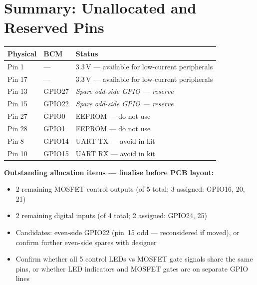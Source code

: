 \documentclass[11pt,a4paper]{article}
\newcommand{\na}{---}
\begin{document}
\section{Summary: Unallocated and Reserved Pins}

\begin{tabular}{L{2cm} L{2cm} L{9cm}}
  \toprule
  \textbf{Physical} & \textbf{BCM} & \textbf{Status} \\
  \midrule
  Pin 1  & \na     & 3.3\,V --- available for low-current peripherals \\
  Pin 17 & \na     & 3.3\,V --- available for low-current peripherals \\
  Pin 13 & GPIO27  & \textit{Spare odd-side GPIO --- reserve} \\
  Pin 15 & GPIO22  & \textit{Spare odd-side GPIO --- reserve} \\
  Pin 27 & GPIO0   & EEPROM --- do not use \\
  Pin 28 & GPIO1   & EEPROM --- do not use \\
  Pin 8  & GPIO14  & UART TX --- avoid in kit \\
  Pin 10 & GPIO15  & UART RX --- avoid in kit \\
  \bottomrule
\end{tabular}

\vspace{10pt}
\begin{warnbox}
\textbf{Outstanding allocation items --- finalise before PCB layout:}
\begin{itemize}[noitemsep]
  \item 2 remaining MOSFET control outputs (of 5 total; 3 assigned: GPIO16, 20, 21)
  \item 2 remaining digital inputs (of 4 total; 2 assigned: GPIO24, 25)
  \item Candidates: even-side GPIO22 (pin~15 odd --- reconsidered if moved),
        or confirm further even-side spares with designer
  \item Confirm whether all 5 control LEDs vs MOSFET gate signals share the same pins,
        or whether LED indicators and MOSFET gates are on separate GPIO lines
\end{itemize}
\end{warnbox}
\end{document}
